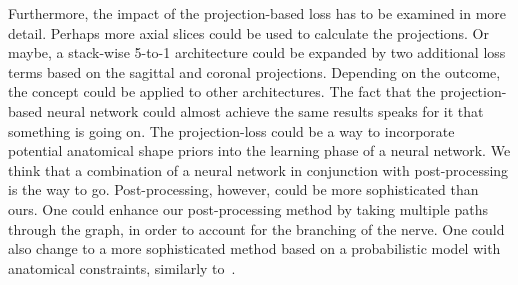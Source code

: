 Furthermore, the impact of the projection-based loss has to be examined in more detail. Perhaps more axial slices could be used to calculate the projections. Or maybe, a stack-wise 5-to-1 architecture could be expanded by two additional loss terms based on the sagittal and coronal projections. Depending on the outcome, the concept could be applied to other architectures. The fact that the projection-based neural network could almost achieve the same results speaks for it that something is going on. The projection-loss could be a way to incorporate potential anatomical shape priors into the learning phase of a neural network. We think that a combination of a neural network in conjunction with post-processing is the way to go. Post-processing, however, could be more sophisticated than ours. One could enhance our post-processing method by taking multiple paths through the graph, in order to account for the branching of the nerve. One could also change to a more sophisticated method based on a probabilistic model with anatomical constraints, similarly to~\cite{Rempfler2015ReconstructingProgramming}.
\endinput